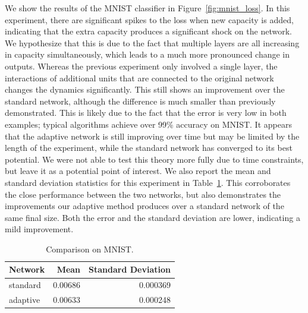 We show the results of the MNIST classifier in Figure~\ref{fig:mnist_loss}.
In this experiment, there are significant spikes to the loss when new capacity is added, indicating that the extra capacity produces a significant shock on the network.
We hypothesize that this is due to the fact that multiple layers are all increasing in capacity simultaneously, which leads to a much more pronounced change in outputs.
Whereas the previous experiment only involved a single layer, the interactions of additional units that are connected to the original network changes the dynamics significantly.
This still shows an improvement over the standard network, although the difference is much smaller than previously demonstrated.
This is likely due to the fact that the error is very low in both examples; typical algorithms achieve over 99\% accuracy on MNIST.
It appears that the adaptive network is still improving over time but may be limited by the length of the experiment, while the standard network has converged to its best potential.
We were not able to test this theory more fully due to time constraints, but leave it as a potential point of interest.
We also report the mean and standard deviation statistics for this experiment in Table~\ref{table:mnist_errors}. 
This corroborates the close performance between the two networks, but also demonstrates the improvements our adaptive method produces over a standard network of the same final size.
Both the error and the standard deviation are lower, indicating a mild improvement.

\begin{table}[!htb]
\centering
\caption{Comparison on MNIST.}
\label{table:mnist_errors}
\begin{tabular}{@{}lrr@{}}
\toprule
Network  & Mean    & Standard Deviation \\ \midrule
standard & 0.00686 & 0.000369           \\
adaptive & 0.00633 & 0.000248           \\ \bottomrule
\end{tabular}
\end{table}


